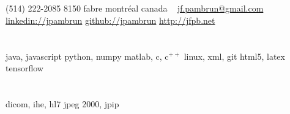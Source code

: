 \documentclass[print]{friggeri-cv}
\begin{document}

\newcommand{\eletr}{\href{http://www.etsmtl.ca/Programmes-Etudes/1er-cycle/Fiche-de-cours?Sigle=ELE747}{ele{\footnotesize747}}}
\newcommand{\eleenv}{\href{http://www.etsmtl.ca/Programmes-Etudes/1er-cycle/Fiche-de-cours?Sigle=ELE116}{ele{\footnotesize116}}}
\newcommand{\infmat}{\href{http://www.polymtl.ca/etudes/cours/details.php?sigle=INF1005a}{inf{\footnotesize1005}a}}
\newcommand{\gtssys}{\href{http://www.etsmtl.ca/Futurs-etudiants/Cycles-sup/Fiche-de-cours?Sigle=GTS840}{gts{\footnotesize840}}}

\begin{aside}
  \section{}
  {\small(514) 222-2085}
  {\small8150} fabre
  montréal
  canada
  ~
  \href{mailto:jf.pambrun@gmail.com}{jf.pambrun@gmail.com}
  \href{https://ca.linkedin.com/in/jpambrun}{linkedin://jpambrun}
  \href{http://github.com/jpambrun}{github://jpambrun}
  \href{http://jfpb.net}{http://jfpb.net}
  \section{}
  \section{}
  java, javascript
  python, numpy
  matlab, c, c{\tiny$^{++}$}
  linux, xml, git
  html{\small5}, latex
  tensorflow
  \section{}
  dicom, ihe, hl{\small7}
  jpeg {\small2000}, jpip

\end{aside}
\end{document}
